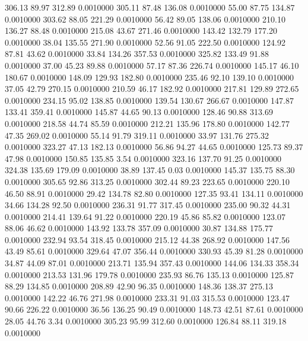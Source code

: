  306.13   89.97  312.89   0.0010000
 305.11   87.48  136.08   0.0010000
  55.00   87.75  134.87   0.0010000
 303.62   88.05  221.29   0.0010000
  56.42   89.05  138.06   0.0010000
 210.10  136.27   88.48   0.0010000
 215.08   43.67  271.46   0.0010000
 143.42  132.79  177.20   0.0010000
  38.04  135.55  271.90   0.0010000
  52.56   91.05  222.50   0.0010000
 124.92   87.81   43.62   0.0010000
  33.84  134.26  357.53   0.0010000
 325.82  133.49   91.88   0.0010000
  37.00   45.23   89.88   0.0010000
  57.17   87.36  226.74   0.0010000
 145.17   46.10  180.67   0.0010000
 148.09  129.93  182.80   0.0010000
 235.46   92.10  139.10   0.0010000
  37.05   42.79  270.15   0.0010000
 210.59   46.17  182.92   0.0010000
 217.81  129.89  272.65   0.0010000
 234.15   95.02  138.85   0.0010000
 139.54  130.67  266.67   0.0010000
 147.87  133.41  359.41   0.0010000
 145.87   44.65   90.13   0.0010000
 128.46   90.88  313.69   0.0010000
 218.58   44.74   85.59   0.0010000
 212.21  135.96  178.80   0.0010000
 142.77   47.35  269.02   0.0010000
  55.14   91.79  319.11   0.0010000
  33.97  131.76  275.32   0.0010000
 323.27   47.13  182.13   0.0010000
  56.86   94.27   44.65   0.0010000
 125.73   89.37   47.98   0.0010000
 150.85  135.85    3.54   0.0010000
 323.16  137.70   91.25   0.0010000
 324.38  135.69  179.09   0.0010000
  38.89  137.45    0.03   0.0010000
 145.37  135.75   88.30   0.0010000
 305.65   92.86  313.25   0.0010000
 302.44   89.23  223.65   0.0010000
 220.10   46.50   88.91   0.0010000
  29.42  134.78   82.80   0.0010000
 127.35   93.41  134.11   0.0010000
  34.66  134.28   92.50   0.0010000
 236.31   91.77  317.45   0.0010000
 235.00   90.32   44.31   0.0010000
 214.41  139.64   91.22   0.0010000
 220.19   45.86   85.82   0.0010000
 123.07   88.06   46.62   0.0010000
 143.92  133.78  357.09   0.0010000
  30.87  134.88  175.77   0.0010000
 232.94   93.54  318.45   0.0010000
 215.12   44.38  268.92   0.0010000
 147.56   43.49   85.61   0.0010000
 329.64   47.07  356.44   0.0010000
 330.93   45.39   81.28   0.0010000
  34.87   44.09   87.01   0.0010000
 213.71  135.94  357.43   0.0010000
 144.06  134.33  358.34   0.0010000
 213.53  131.96  179.78   0.0010000
 235.93   86.76  135.13   0.0010000
 125.87   88.29  134.85   0.0010000
 208.89   42.90   96.35   0.0010000
 148.36  138.37  275.13   0.0010000
 142.22   46.76  271.98   0.0010000
 233.31   91.03  315.53   0.0010000
 123.47   90.66  226.22   0.0010000
  36.56  136.25   90.49   0.0010000
 148.73   42.51   87.61   0.0010000
  28.05   44.76    3.34   0.0010000
 305.23   95.99  312.60   0.0010000
 126.84   88.11  319.18   0.0010000
